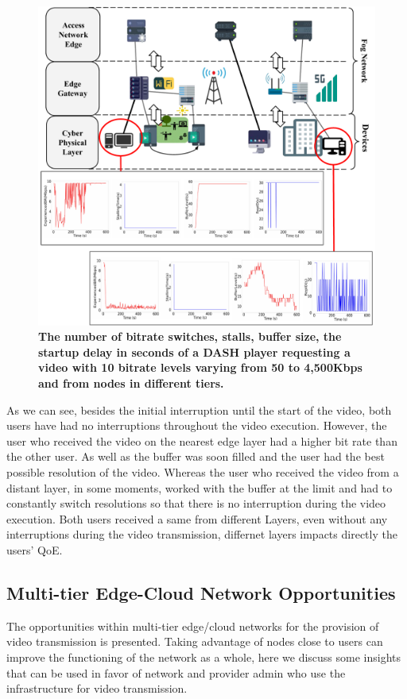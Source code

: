 \begin{figure}
    \centering
    \includegraphics[width=0.9\linewidth]{images/qoe-multi-level.pdf}
    \caption{\textbf{The number of bitrate switches, stalls, buffer size, the startup delay in seconds of a DASH player requesting a video with 10 bitrate levels varying from 50 to 4,500Kbps and from nodes in different tiers.}}
    \label{fig:impact-two-layers}
\end{figure}


As we can see, besides the initial interruption until the start of the video, both users have had no interruptions throughout the video execution. However, the user who received the video on the nearest edge layer had a higher bit rate than the other user. As well as the buffer was soon filled and the user had the best possible resolution of the video. Whereas the user who received the video from a distant layer, in some moments, worked with the buffer at the limit and had to constantly switch resolutions so that there is no interruption during the video execution. Both users received a same from different Layers, even without any interruptions during the video transmission, differnet layers impacts directly the users' QoE.


\subsection{Multi-tier Edge-Cloud Network Opportunities}

The opportunities within multi-tier edge/cloud networks for the provision of video transmission is presented. Taking advantage of nodes close to users can improve the functioning of the network as a whole, here we discuss some insights that can be used in favor of network and provider admin who use the infrastructure for video transmission.

